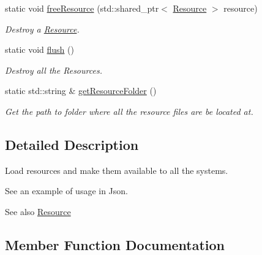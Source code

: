 \begin{DoxyCompactItemize}
static void \hyperlink{classTarbora_1_1ResourceManager_a5a99005c26783713e6581d53a997020e}{free\+Resource} (std\+::shared\+\_\+ptr$<$ \hyperlink{classTarbora_1_1Resource}{Resource} $>$ resource)
\begin{DoxyCompactList}\small\item\em Destroy a \hyperlink{classTarbora_1_1Resource}{Resource}. \end{DoxyCompactList}\item 
\mbox{\label{classTarbora_1_1ResourceManager_afc7aaf81229d7ca40c25bde72ab36420}} 
static void \hyperlink{classTarbora_1_1ResourceManager_afc7aaf81229d7ca40c25bde72ab36420}{flush} ()
\begin{DoxyCompactList}\small\item\em Destroy all the Resources. \end{DoxyCompactList}\item 
\mbox{\label{classTarbora_1_1ResourceManager_ac557dc5499cc9bfd55fea10eaac0da5b}} 
static std\+::string \& \hyperlink{classTarbora_1_1ResourceManager_ac557dc5499cc9bfd55fea10eaac0da5b}{get\+Resource\+Folder} ()
\begin{DoxyCompactList}\small\item\em Get the path to folder where all the resource files are be located at. \end{DoxyCompactList}\end{DoxyCompactItemize}


\subsection{Detailed Description}
Load resources and make them available to all the systems. 

See an example of usage in Json. \begin{DoxySeeAlso}{See also}
\hyperlink{classTarbora_1_1Resource}{Resource} 
\end{DoxySeeAlso}


\subsection{Member Function Documentation}
\mbox{\label{classTarbora_1_1ResourceManager_a5a99005c26783713e6581d53a997020e}} 
